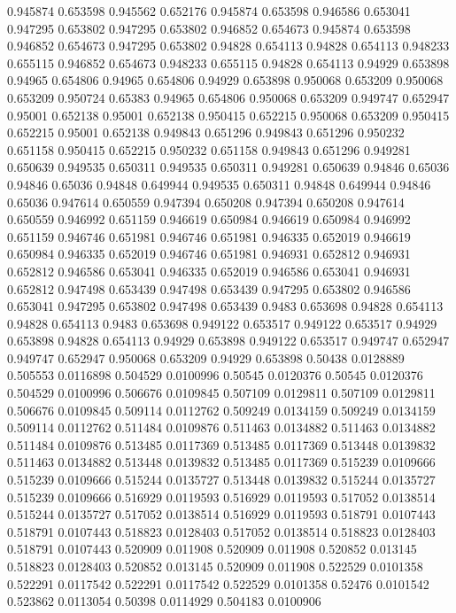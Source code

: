 0.945874 0.653598
0.945562 0.652176
0.945874 0.653598
0.946586 0.653041
0.947295 0.653802
0.947295 0.653802
0.946852 0.654673
0.945874 0.653598
0.946852 0.654673
0.947295 0.653802
0.94828 0.654113
0.94828 0.654113
0.948233 0.655115
0.946852 0.654673
0.948233 0.655115
0.94828 0.654113
0.94929 0.653898
0.94965 0.654806
0.94965 0.654806
0.94929 0.653898
0.950068 0.653209
0.950068 0.653209
0.950724 0.65383
0.94965 0.654806
0.950068 0.653209
0.949747 0.652947
0.95001 0.652138
0.95001 0.652138
0.950415 0.652215
0.950068 0.653209
0.950415 0.652215
0.95001 0.652138
0.949843 0.651296
0.949843 0.651296
0.950232 0.651158
0.950415 0.652215
0.950232 0.651158
0.949843 0.651296
0.949281 0.650639
0.949535 0.650311
0.949535 0.650311
0.949281 0.650639
0.94846 0.65036
0.94846 0.65036
0.94848 0.649944
0.949535 0.650311
0.94848 0.649944
0.94846 0.65036
0.947614 0.650559
0.947394 0.650208
0.947394 0.650208
0.947614 0.650559
0.946992 0.651159
0.946619 0.650984
0.946619 0.650984
0.946992 0.651159
0.946746 0.651981
0.946746 0.651981
0.946335 0.652019
0.946619 0.650984
0.946335 0.652019
0.946746 0.651981
0.946931 0.652812
0.946931 0.652812
0.946586 0.653041
0.946335 0.652019
0.946586 0.653041
0.946931 0.652812
0.947498 0.653439
0.947498 0.653439
0.947295 0.653802
0.946586 0.653041
0.947295 0.653802
0.947498 0.653439
0.9483 0.653698
0.94828 0.654113
0.94828 0.654113
0.9483 0.653698
0.949122 0.653517
0.949122 0.653517
0.94929 0.653898
0.94828 0.654113
0.94929 0.653898
0.949122 0.653517
0.949747 0.652947
0.949747 0.652947
0.950068 0.653209
0.94929 0.653898
0.50438 0.0128889
0.505553 0.0116898
0.504529 0.0100996
0.50545 0.0120376
0.50545 0.0120376
0.504529 0.0100996
0.506676 0.0109845
0.507109 0.0129811
0.507109 0.0129811
0.506676 0.0109845
0.509114 0.0112762
0.509249 0.0134159
0.509249 0.0134159
0.509114 0.0112762
0.511484 0.0109876
0.511463 0.0134882
0.511463 0.0134882
0.511484 0.0109876
0.513485 0.0117369
0.513485 0.0117369
0.513448 0.0139832
0.511463 0.0134882
0.513448 0.0139832
0.513485 0.0117369
0.515239 0.0109666
0.515239 0.0109666
0.515244 0.0135727
0.513448 0.0139832
0.515244 0.0135727
0.515239 0.0109666
0.516929 0.0119593
0.516929 0.0119593
0.517052 0.0138514
0.515244 0.0135727
0.517052 0.0138514
0.516929 0.0119593
0.518791 0.0107443
0.518791 0.0107443
0.518823 0.0128403
0.517052 0.0138514
0.518823 0.0128403
0.518791 0.0107443
0.520909 0.011908
0.520909 0.011908
0.520852 0.013145
0.518823 0.0128403
0.520852 0.013145
0.520909 0.011908
0.522529 0.0101358
0.522291 0.0117542
0.522291 0.0117542
0.522529 0.0101358
0.52476 0.0101542
0.523862 0.0113054
0.50398 0.0114929
0.504183 0.0100906
